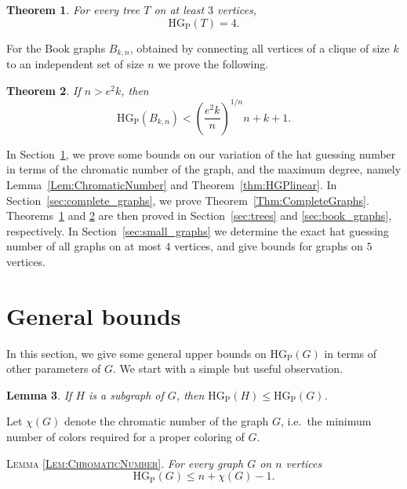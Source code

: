 \documentclass[a4paper,11pt]{amsproc}
\theoremstyle{plain}
\newtheorem{Theorem} {Theorem} [section]
\newtheorem{Lemma} [Theorem] {Lemma}
\theoremstyle{definition}
\newcommand{\HGP}{\mathrm{HG_{P}}}
\begin{document}
\begin{Theorem}
 \label{Thm:Trees}
For every tree $T$ on at least $3$ vertices, 
\[\HGP(T) = 4.\]
\end{Theorem}

For the Book graphs $B_{k, n}$, obtained by connecting all vertices of a clique of size $k$ to an independent set of size $n$ we prove the following.

\begin{Theorem}\label{Thm:BookGraphUpperBound}
 If $n > e^2 k$, then
 \[
  \HGP(B_{k,n}) < \left( \frac{e^2 k}{n} \right)^{1/n}n + k + 1.
 \]
\end{Theorem}

In Section~\ref{sec:general_bounds}, we prove some bounds on our variation of the hat guessing number in terms of the chromatic number of the graph, and the maximum degree, namely Lemma~\ref{Lem:ChromaticNumber} and Theorem~\ref{thm:HGPlinear}. 
In Section~\ref{sec:complete_graphs}, we prove Theorem~\ref{Thm:CompleteGraphs}.
Theorems~\ref{Thm:Trees} and \ref{Thm:BookGraphUpperBound} are then proved in Section~\ref{sec:trees} and \ref{sec:book_graphs}, respectively. 
In Section~\ref{sec:small_graphs} we determine the exact hat guessing number of all graphs on at most $4$ vertices, and give bounds for graphs on $5$ vertices.



\section{General bounds}
\label{sec:general_bounds}

In this section, we give some general upper bounds on $\HGP(G)$ in terms of other parameters of $G$.
We start with a simple but useful observation.

\begin{Lemma}\label{Lem:Subgraphs}
 If $H$ is a subgraph of $G$, then $\HGP(H) \leq \HGP(G)$.
\end{Lemma}

Let $\chi(G)$ denote the chromatic number of the graph $G$, i.e.\ the minimum number of colors required for a proper coloring of $G$.

\bigskip

{\scshape Lemma \ref{Lem:ChromaticNumber}.}
{\it 
 For every graph $G$ on $n$ vertices 
 \[
  \HGP(G) \leq n + \chi(G) - 1.
 \]}
\end{document}
